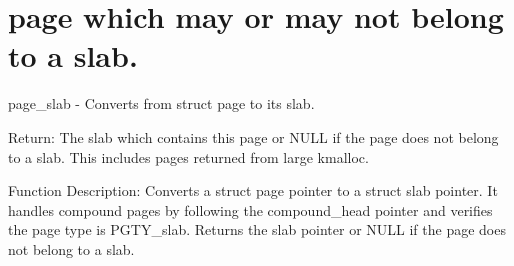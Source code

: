 \chapter{page which may or may not belong to a slab. }
\hypertarget{_a}{}\label{_a}
page\+\_\+slab -\/ Converts from struct page to its slab.  

Return:\+ The slab which contains this page or NULL if the page does not belong to a slab. This includes pages returned from large kmalloc.

Function Description:\+ Converts a struct page pointer to a struct slab pointer. It handles compound pages by following the compound\+\_\+head pointer and verifies the page type is PGTY\+\_\+slab. Returns the slab pointer or NULL if the page does not belong to a slab. 